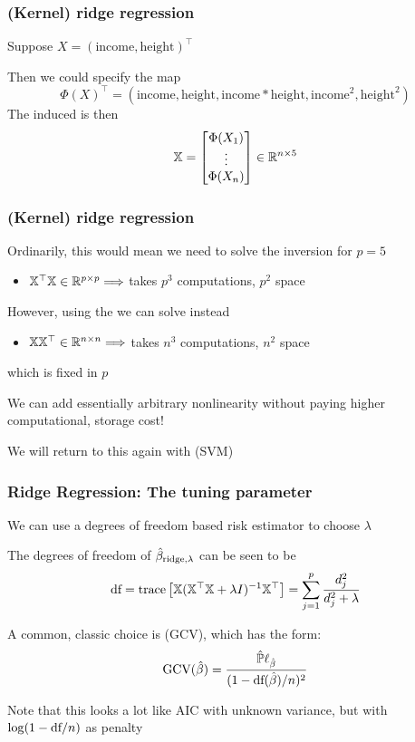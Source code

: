 \documentclass{beamer}
\begin{document}
\begin{frame}
\frametitle{(Kernel) ridge regression}
 Suppose $X = (\textrm{income},\textrm{height})^{\top}$

\vsp Then we could specify the map 
\[
\Phi(X)^{\top} = (\textrm{income},\textrm{height}, \textrm{income}*\textrm{height},\textrm{income}^2,\textrm{height}^2)
\]
The induced  is then
\[
\mathbb{X} = 
\begin{bmatrix}
\Phi(X_1) \\
 \vdots  \\
\Phi(X_n)
\end{bmatrix}
\in
\mathbb{R}^{n \times 5}
\]
\end{frame}

\begin{frame}
\frametitle{(Kernel) ridge regression}
Ordinarily, this would mean we need to solve the  inversion for $p = 5$
\begin{itemize}
\item $\mathbb{X}^{\top} \mathbb{X} \in \mathbb{R}^{p \times p} \Longrightarrow$ takes $p^3$ computations, $p^2$ space 
\end{itemize}
\vsp

However, using the  we can solve instead
\begin{itemize}
\item $ \mathbb{X} \mathbb{X}^{\top}\in \mathbb{R}^{n \times n} \Longrightarrow$ takes $n^3$ computations, $n^2$ space
\end{itemize}
which is fixed in $p$

\vvvsp
{} We can add essentially arbitrary nonlinearity without paying higher computational, storage
 cost!
 
 \vvsp
 We will return to this again with  (SVM)
\end{frame}


\begin{frame}[fragile]
\frametitle{Ridge Regression: The tuning parameter}
We can use a degrees of freedom based risk estimator to choose $\lambda$

\vsp
The degrees of freedom of $\hat{\beta}_{\textrm{ridge},\lambda}$ can be seen to be
\[
\textrm{df} = \textrm{trace} \left[\mathbb{X}(\mathbb{X}^{\top}\mathbb{X} + \lambda I)^{-1} \mathbb{X}^{\top}\right] = \sum_{j=1}^p \frac{d_j^2}{d_j^2 + \lambda}
\]

A common, classic choice is  (GCV), which has the form:
\[
\textrm{GCV}(\hat\beta) = \frac{\hat{\mathbb{P}} \ell_{\hat{\beta}}}{(1-\textrm{df}(\hat{\beta})/n)^2}
\]


\vsp
Note that this looks a lot like AIC with unknown variance, but with $\log(1- \textrm{df}{}/n)$ as penalty
\end{frame}
\end{document}
